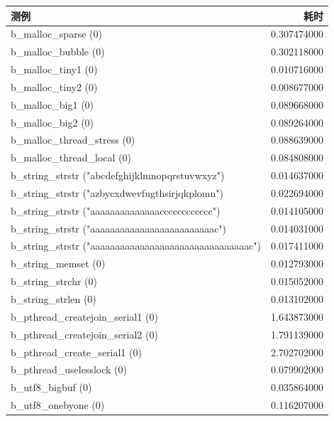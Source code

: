 \begin{table}[H]
    \centering
    \begin{tabular}{|l|r|}
        \hline
        测例 & 耗时 \\
        \hline
        b\_malloc\_sparse (0) & 0.307474000 \\
        \hline
        b\_malloc\_bubble (0) & 0.302118000 \\
        \hline
        b\_malloc\_tiny1 (0) & 0.010716000 \\
        \hline
        b\_malloc\_tiny2 (0) & 0.008677000 \\
        \hline
        b\_malloc\_big1 (0) & 0.089668000 \\
        \hline
        b\_malloc\_big2 (0) & 0.089264000 \\
        \hline
        b\_malloc\_thread\_stress (0) & 0.088639000 \\
        \hline
        b\_malloc\_thread\_local (0) & 0.084808000 \\
        \hline
        b\_string\_strstr ("abcdefghijklmnopqrstuvwxyz") & 0.014637000 \\
        \hline
        b\_string\_strstr ("azbycxdwevfugthsirjqkplomn") & 0.022694000 \\
        \hline
        b\_string\_strstr ("aaaaaaaaaaaaaacccccccccccc") & 0.014105000 \\
        \hline
        b\_string\_strstr ("aaaaaaaaaaaaaaaaaaaaaaaaac") & 0.014031000 \\
        \hline
        b\_string\_strstr ("aaaaaaaaaaaaaaaaaaaaaaaaaaaaaaaac") & 0.017411000 \\
        \hline
        b\_string\_memset (0) & 0.012793000 \\
        \hline
        b\_string\_strchr (0) & 0.015052000 \\
        \hline
        b\_string\_strlen (0) & 0.013102000 \\
        \hline
        b\_pthread\_createjoin\_serial1 (0) & 1.643873000 \\
        \hline
        b\_pthread\_createjoin\_serial2 (0) & 1.791139000 \\
        \hline
        b\_pthread\_create\_serial1 (0) & 2.702702000 \\
        \hline
        b\_pthread\_uselesslock (0) & 0.079902000 \\
        \hline
        b\_utf8\_bigbuf (0) & 0.035864000 \\
        \hline
        b\_utf8\_onebyone (0) & 0.116207000 \\

\end{tabular}
\end{table}
